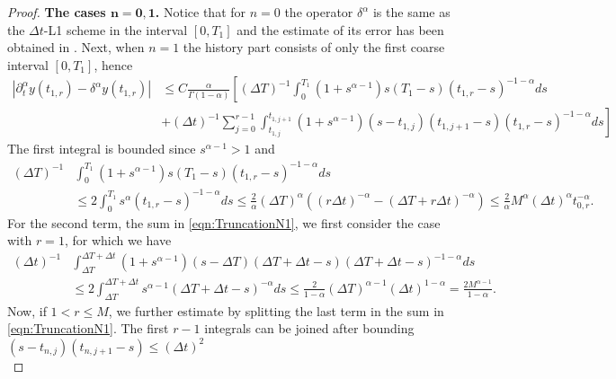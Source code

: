 \documentclass[12pt,a4paper]{article}
\begin{document}
\begin{proof}
	\medskip\noindent\textbf{The cases $\mathbf{n=0,1}$.} Notice that for $n=0$ the operator $\delta^\alpha$ is the same as the $\Delta t$-L1 scheme in the interval $[0, T_1]$ and the estimate of its error has been obtained in \cite{del2025numerical}. Next, when $n=1$ the history part consists of only the first coarse interval $[0, T_1]$, hence
	\begin{equation}\label{eqn:TruncationN1}
		\begin{split}
			|\partial^\alpha_t y(t_{1,r}) - \delta^\alpha y(t_{1,r})| 
			&\leq C\frac{\alpha}{\Gamma(1-\alpha)} \left[(\Delta T)^{-1}\int_0^{T_1} (1+s^{\alpha-1})s(T_1-s)(t_{1,r}-s)^{-1-\alpha} ds \right.\\
			&\left.+ (\Delta t)^{-1}\sum_{j=0}^{r-1} \int_{t_{1,j}}^{t_{1,j+1}} (1+s^{\alpha-1})(s-t_{1,j})(t_{1,j+1}-s)(t_{1,r}-s)^{-1-\alpha} ds \right]
		\end{split}
	\end{equation}
	The first integral is bounded since $s^{\alpha-1} > 1$ and
	\begin{equation}
		\begin{split}
			(\Delta T)^{-1}&\int_0^{T_1} (1+s^{\alpha-1})s(T_1-s)(t_{1,r}-s)^{-1-\alpha} ds \\
			&\leq 2 \int_0^{T_1} s^\alpha (t_{1,r} - s)^{-1-\alpha} ds \leq \frac{2}{\alpha} (\Delta T)^{\alpha} \left((r \Delta t)^{-\alpha} - \left(\Delta T + r \Delta t\right)^{-\alpha}\right) \leq \frac{2}{\alpha} M^{\alpha} (\Delta t)^{\alpha} t_{0,r}^{-\alpha}.
		\end{split}
	\end{equation}
	For the second term, the sum in \eqref{eqn:TruncationN1}, we first consider the case with $r=1$, for which we have
	\begin{equation}
		\begin{split}
			(\Delta t)^{-1}&\int_{\Delta T}^{\Delta T + \Delta t} (1+s^{\alpha-1})(s-\Delta T)(\Delta T + \Delta t-s)(\Delta T + \Delta t-s)^{-1-\alpha} ds \\
			&\leq 2 \int_{\Delta T}^{\Delta T + \Delta t} s^{\alpha-1}(\Delta T + \Delta t-s)^{-\alpha} ds \leq \frac{2}{1-\alpha} (\Delta T)^{\alpha-1} (\Delta t)^{1-\alpha} = \frac{2 M^{\alpha-1}}{1-\alpha}. 
		\end{split}
	\end{equation}
	Now, if $1 < r \leq M$, we further estimate by splitting the last term in the sum in \eqref{eqn:TruncationN1}. The first $r-1$ integrals can be joined after bounding $(s-t_{n,j})(t_{n,j+1}-s) \leq (\Delta t)^2$
	\begin{equation}

\end{equation}
\end{proof}
\end{document}
